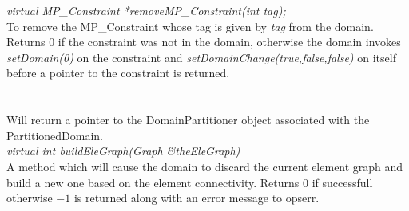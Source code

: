 {\em virtual MP\_Constraint *removeMP\_Constraint(int tag);} \\
To remove the MP\_Constraint whose tag is given by {\em tag} from the
domain. Returns $0$ if the constraint was not in the domain, otherwise
the domain invokes {\em setDomain(0)} on the constraint and {\em
setDomainChange(true,false,false)} on itself before a pointer to the
constraint is returned.\\  




  \\
 \\
Will return a pointer to the DomainPartitioner object associated with the
PartitionedDomain. \\

{\em virtual int buildEleGraph(Graph \&theEleGraph)} \\
A method which will cause the domain to discard the current element
graph and build a new one based on the element connectivity. Returns
$0$ if successfull otherwise $-1$ is returned along with an error
message to opserr. \\
